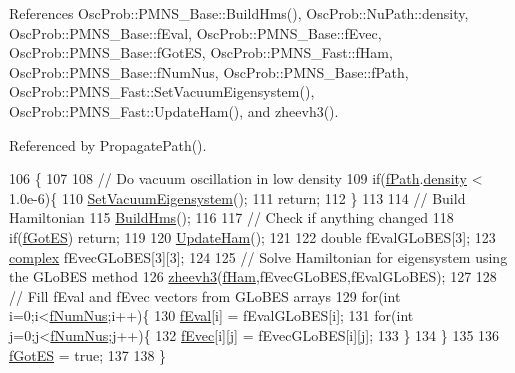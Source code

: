 References Osc\+Prob\+::\+P\+M\+N\+S\+\_\+\+Base\+::\+Build\+Hms(), Osc\+Prob\+::\+Nu\+Path\+::density, Osc\+Prob\+::\+P\+M\+N\+S\+\_\+\+Base\+::f\+Eval, Osc\+Prob\+::\+P\+M\+N\+S\+\_\+\+Base\+::f\+Evec, Osc\+Prob\+::\+P\+M\+N\+S\+\_\+\+Base\+::f\+Got\+ES, Osc\+Prob\+::\+P\+M\+N\+S\+\_\+\+Fast\+::f\+Ham, Osc\+Prob\+::\+P\+M\+N\+S\+\_\+\+Base\+::f\+Num\+Nus, Osc\+Prob\+::\+P\+M\+N\+S\+\_\+\+Base\+::f\+Path, Osc\+Prob\+::\+P\+M\+N\+S\+\_\+\+Fast\+::\+Set\+Vacuum\+Eigensystem(), Osc\+Prob\+::\+P\+M\+N\+S\+\_\+\+Fast\+::\+Update\+Ham(), and zheevh3().



Referenced by Propagate\+Path().


\begin{DoxyCode}
106 \{
107 
108   \textcolor{comment}{// Do vacuum oscillation in low density}
109   \textcolor{keywordflow}{if}(\hyperlink{classOscProb_1_1PMNS__Base_a849437aa8891fe042e86886ce8f81c6e}{fPath}.\hyperlink{structOscProb_1_1NuPath_a54ddd451db69bc54434de3cf18a117ca}{density} < 1.0e-6)\{
110     \hyperlink{classOscProb_1_1PMNS__Fast_a76dd5a761df8689c502b28ad0391f9e2}{SetVacuumEigensystem}();
111     \textcolor{keywordflow}{return};
112   \}
113 
114   \textcolor{comment}{// Build Hamiltonian}
115   \hyperlink{classOscProb_1_1PMNS__Base_ad0faf5eae755afb1baa1fcd5ffebad41}{BuildHms}();
116 
117   \textcolor{comment}{// Check if anything changed  }
118   \textcolor{keywordflow}{if}(\hyperlink{classOscProb_1_1PMNS__Base_a6dc5cd010d2d70b2324745b4e53e9839}{fGotES}) \textcolor{keywordflow}{return};
119 
120   \hyperlink{classOscProb_1_1PMNS__Fast_a16248082308f9d2c332ebf1be0aa90c3}{UpdateHam}();
121 
122   \textcolor{keywordtype}{double} fEvalGLoBES[3];
123   \hyperlink{classOscProb_1_1PMNS__Base_ae86ec4718808ce9d02e5f5b4226714ab}{complex} fEvecGLoBES[3][3];
124 
125   \textcolor{comment}{// Solve Hamiltonian for eigensystem using the GLoBES method}
126   \hyperlink{zheevh3_8cxx_a96ac4b39a8406951c69eeabad77a3bc6}{zheevh3}(\hyperlink{classOscProb_1_1PMNS__Fast_aab37f2a7f59ab7026a8a21a561115dd0}{fHam},fEvecGLoBES,fEvalGLoBES);
127 
128   \textcolor{comment}{// Fill fEval and fEvec vectors from GLoBES arrays  }
129   \textcolor{keywordflow}{for}(\textcolor{keywordtype}{int} i=0;i<\hyperlink{classOscProb_1_1PMNS__Base_a24bb74bed63569dfe88b18fa6a08060e}{fNumNus};i++)\{
130     \hyperlink{classOscProb_1_1PMNS__Base_a6319c34d7decbb9d7d6da279c06e8c2d}{fEval}[i] = fEvalGLoBES[i];
131     \textcolor{keywordflow}{for}(\textcolor{keywordtype}{int} j=0;j<\hyperlink{classOscProb_1_1PMNS__Base_a24bb74bed63569dfe88b18fa6a08060e}{fNumNus};j++)\{
132       \hyperlink{classOscProb_1_1PMNS__Base_a093e7bd31d4ef52ed52df414e12c1d17}{fEvec}[i][j] = fEvecGLoBES[i][j];
133     \}
134   \}
135   
136   \hyperlink{classOscProb_1_1PMNS__Base_a6dc5cd010d2d70b2324745b4e53e9839}{fGotES} = \textcolor{keyword}{true};
137 
138 \}
\end{DoxyCode}
